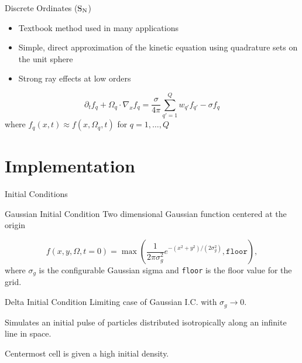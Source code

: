 \documentclass{beamer}
\newcommand{\SN}{\ensuremath{\textnormal{S}_\textnormal{N}}\xspace}
\begin{document}
    \begin{frame}{Discrete Ordinates (\SN)}
        \begin{itemize}
            \item Textbook method used in many applications
            \item Simple, direct approximation of the kinetic equation using quadrature sets on the unit sphere
            \item Strong ray effects at low orders
        \end{itemize}

        \vfill

        \begin{equation*}
            \partial_t f_q + \Omega_q \cdot \nabla_x f_q = \frac{\sigma}{4\pi} \sum_{q' = 1}^Q w_{q'} f_{q'} - \sigma f_q
        \end{equation*}
        where $f_q(x,t) \approx f(x,\Omega_q,t)$ for $q = 1, \dots, Q$
    \end{frame}

\section{Implementation}

    \begin{frame}{Initial Conditions}
        \begin{block}{Gaussian Initial Condition}
            Two dimensional Gaussian function centered at the origin

            \begin{equation*}
                f(x, y, \Omega, t=0) = \max \left( \frac{1}{2 \pi \sigma_g^2} e^{-(x^2 + y^2) / (2 \sigma_g^2)}, \texttt{floor} \right), 
            \end{equation*}
            where $\sigma_g$ is the configurable Gaussian sigma and \texttt{floor} is the floor value for the grid.
        \end{block}

        \vfill

        \begin{block}{Delta Initial Condition}
            Limiting case of Gaussian I.C. with $\sigma_g \to 0$.

            Simulates an initial pulse of particles distributed isotropically along an infinite line in space.

            Centermost cell is given a high initial density.
        \end{block}
    \end{frame}
\end{document}
